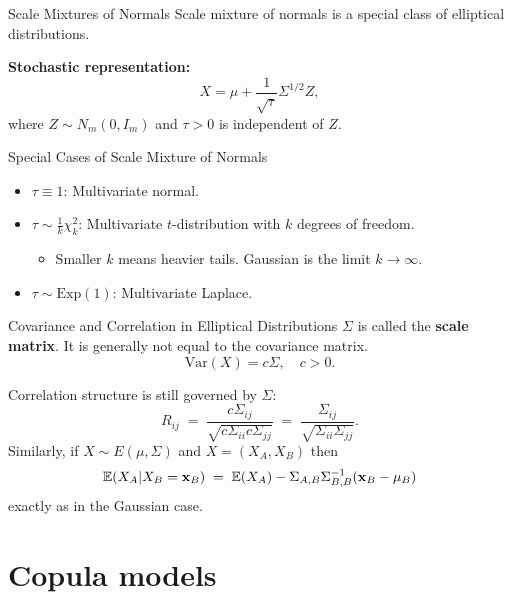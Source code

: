 \documentclass[11pt,handout,aspectratio=169]{beamer}
\begin{document}
\begin{frame}{Scale Mixtures of Normals}
Scale mixture of normals is a special class of elliptical distributions. 
\bigskip

  \textbf{Stochastic representation:}
  \begin{equation*}
    X = \mu + \frac{1}{\sqrt{\tau}} \Sigma^{1/2} Z,
  \end{equation*}
  where $Z \sim N_m(0, I_m)$ and $\tau > 0$ is independent of $Z$.
  \vspace{0.5cm}
  \begin{block}{Special Cases of Scale Mixture of Normals}
  	  \begin{itemize}
    \item $\tau \equiv 1$: Multivariate normal.
    \item $\tau \sim \frac{1}{k} \chi^2_k$: Multivariate $t$-distribution with $k$ degrees of freedom.
    \begin{itemize}
    \item Smaller $k$ means heavier tails. Gaussian is the limit $k\to \infty$.
    \end{itemize}
    \item $\tau \sim \text{Exp}(1)$: Multivariate Laplace.
  \end{itemize}
    \end{block}
\end{frame}

\begin{frame}{Covariance and Correlation in Elliptical Distributions}
$\Sigma$ is called the \textbf{scale matrix}. It is generally not equal to the covariance matrix.
\medskip
      \begin{equation*}
        \mathrm{Var}(X) = c \Sigma, \quad c > 0.
      \end{equation*}

Correlation structure is still governed by $\Sigma$:
$$
R_{ij}\;=\;\frac{c\Sigma_{ij}}{\sqrt{c\Sigma_{ii}c\Sigma_{jj}}}\;=\;\frac{\Sigma_{ij}}{\sqrt{\Sigma_{ii}\Sigma_{jj}}}.
$$
Similarly, if $X\sim E(\mu,\Sigma)$ and $X=(X_A,X_B)$ then 
$$
\mathbb E(X_A|X_B=\mathbf{x}_B)\;=\;\mathbb E(X_A)-\Sigma_{A,B}\Sigma_{B,B}^{-1}(\mathbf{x}_B-\mu_B)
$$
exactly as in the Gaussian case.
\end{frame}

\section{Copula models}
\end{document}
